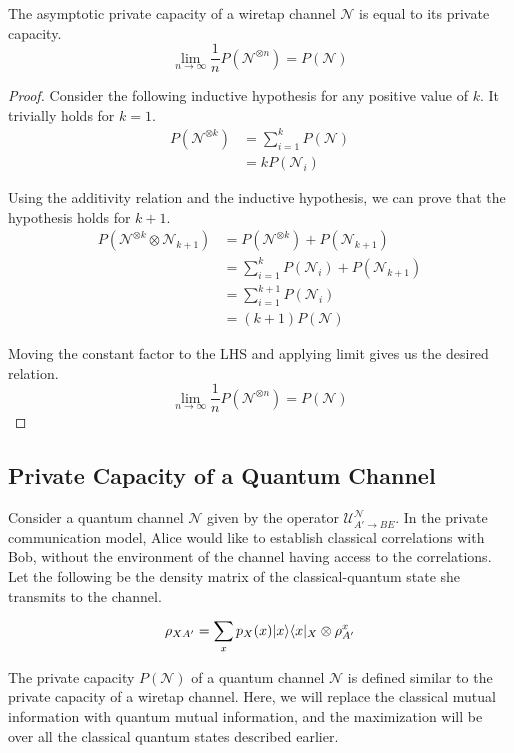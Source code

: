 \begin{theorem}
The asymptotic private capacity of a wiretap channel $\mathcal{N}$ is equal to its private capacity.
$$\lim_{n \rightarrow \infty} \frac{1}{n} P(\mathcal{N}^{\otimes n}) = P(\mathcal{N})$$
\end{theorem}

\begin{proof}
Consider the following inductive hypothesis for any positive value of $k$. It trivially holds for $k=1$.
\begin{align*}
P(\mathcal{N}^{\otimes k}) &= \sum_{i=1}^k P(\mathcal{N}) \\
&= k P(\mathcal{N}_i)
\end{align*}

Using the additivity relation and the inductive hypothesis, we can prove that the hypothesis holds for $k+1$.
\begin{align*}
P(\mathcal{N}^{\otimes k} \otimes \mathcal{N}_{k+1}) &= P(\mathcal{N}^{\otimes k}) + P(\mathcal{N}_{k+1}) \\
&= \sum_{i=1}^{k} P(\mathcal{N}_i) + P(\mathcal{N}_{k+1}) \\
&= \sum_{i=1}^{k+1} P(\mathcal{N}_i) \\
&= (k+1) P(\mathcal{N})
\end{align*}

Moving the constant factor to the LHS and applying limit gives us the desired relation.
$$\lim_{n \rightarrow \infty} \frac{1}{n} P(\mathcal{N}^{\otimes n}) = P(\mathcal{N})$$
\end{proof}

\subsection{Private Capacity of a Quantum Channel}

Consider a quantum channel $\mathcal{N}$ given by the operator $\mathcal{U}_{A' \rightarrow BE}^{\mathcal{N}}$. In the private communication model, Alice would like to establish classical correlations with Bob, without the environment of the channel having access to the correlations. Let the following be the density matrix of the classical-quantum state she transmits to the channel.

$$\rho_{XA'} = \sum_{x} p_X(x) \lvert x\rangle\langle x\rvert_X \otimes \rho_{A'}^x $$

The private capacity $P(\mathcal{N})$ of a quantum channel $\mathcal{N}$ is defined similar to the private capacity of a wiretap channel. Here, we will replace the classical mutual information with quantum mutual information, and the maximization will be over all the classical quantum states described earlier.

